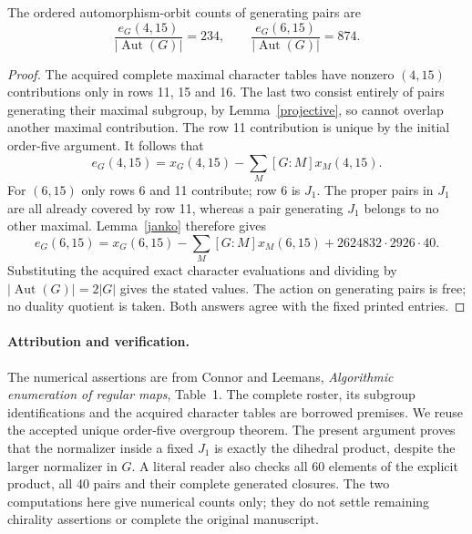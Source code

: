 \documentclass[11pt,a4paper]{article}
\begin{document}
\begin{theorem}
The ordered automorphism-orbit counts of generating pairs are
\[
\frac{e_G(4,15)}{|\operatorname{Aut}(G)|}=234,
\qquad
\frac{e_G(6,15)}{|\operatorname{Aut}(G)|}=874.
\]
\end{theorem}
\begin{proof}
The acquired complete maximal character tables have nonzero
$(4,15)$ contributions only in rows 11, 15 and 16. The last
two consist entirely of pairs generating their maximal subgroup,
by Lemma~\ref{projective}, so cannot overlap another maximal
contribution. The row 11 contribution is unique by the initial
order-five argument. It follows that
\[
e_G(4,15)=x_G(4,15)-\sum_M[G:M]x_M(4,15).
\]
For $(6,15)$ only rows 6 and 11 contribute; row 6 is $J_1$.
The proper pairs in $J_1$ are all already covered by row 11,
whereas a pair generating $J_1$ belongs to no other maximal.
Lemma~\ref{janko} therefore gives
\[
e_G(6,15)=x_G(6,15)-\sum_M[G:M]x_M(6,15)
              +2624832\cdot2926\cdot40.
\]
Substituting the acquired exact character evaluations and dividing
by $|\operatorname{Aut}(G)|=2|G|$ gives the stated values. The
action on generating pairs is free; no duality quotient is taken.
Both answers agree with the fixed printed entries.
\end{proof}

\paragraph{Attribution and verification.}
The numerical assertions are from Connor and Leemans,
\emph{Algorithmic enumeration of regular maps}, Table~1.
The complete roster, its subgroup identifications and the acquired
character tables are borrowed premises. We reuse the accepted
unique order-five overgroup theorem. The present argument proves
that the normalizer inside a fixed $J_1$ is exactly the dihedral
product, despite the larger normalizer in $G$. A literal reader
also checks all 60 elements of the explicit product, all 40
pairs and their complete generated closures. The two computations
here give numerical counts only; they do not settle remaining
chirality assertions or complete the original manuscript.
\end{document}
